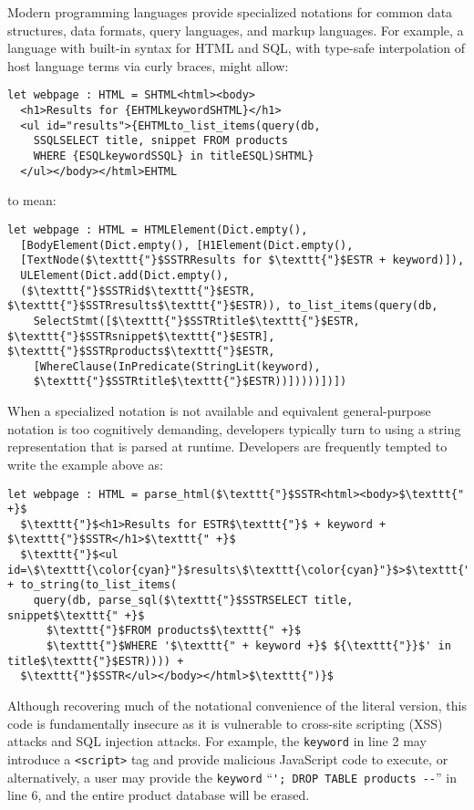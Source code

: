 \documentclass{sig-alternate}
\let\li\lstinline
\begin{document}
Modern programming languages  provide specialized notations for common data structures, data formats, query languages, and markup languages. For example, a language with built-in syntax for HTML and SQL, with type-safe interpolation of host language terms via curly braces, might allow:

\begin{lstlisting}
let webpage : HTML = SHTML<html><body>
  <h1>Results for {EHTMLkeywordSHTML}</h1>
  <ul id="results">{EHTMLto_list_items(query(db, 
    SSQLSELECT title, snippet FROM products
    WHERE {ESQLkeywordSSQL} in titleESQL)SHTML}
  </ul></body></html>EHTML
\end{lstlisting}

to mean:

\begin{lstlisting}
let webpage : HTML = HTMLElement(Dict.empty(),
  [BodyElement(Dict.empty(), [H1Element(Dict.empty(),
  [TextNode($\texttt{"}$SSTRResults for $\texttt{"}$ESTR + keyword)]), 
  ULElement(Dict.add(Dict.empty(),
  ($\texttt{"}$SSTRid$\texttt{"}$ESTR, $\texttt{"}$SSTRresults$\texttt{"}$ESTR)), to_list_items(query(db, 
    SelectStmt([$\texttt{"}$SSTRtitle$\texttt{"}$ESTR, $\texttt{"}$SSTRsnippet$\texttt{"}$ESTR], $\texttt{"}$SSTRproducts$\texttt{"}$ESTR, 
    [WhereClause(InPredicate(StringLit(keyword),
    $\texttt{"}$SSTRtitle$\texttt{"}$ESTR))]))))])])
\end{lstlisting}

When a specialized notation is not available and equivalent general-purpose notation is too cognitively demanding, developers typically turn to using a string representation that is parsed at runtime. Developers are frequently  tempted to write the example above as:

\begin{lstlisting}
let webpage : HTML = parse_html($\texttt{"}$SSTR<html><body>$\texttt{" +}$
  $\texttt{"}$<h1>Results for ESTR$\texttt{"}$ + keyword + $\texttt{"}$SSTR</h1>$\texttt{" +}$
  $\texttt{"}$<ul id=\$\texttt{\color{cyan}"}$results\$\texttt{\color{cyan}"}$>$\texttt{"}$ESTR + to_string(to_list_items(
    query(db, parse_sql($\texttt{"}$SSTRSELECT title, snippet$\texttt{" +}$
      $\texttt{"}$FROM products$\texttt{" +}$
      $\texttt{"}$WHERE '$\texttt{" + keyword +}$ ${\texttt{"}}$' in title$\texttt{"}$ESTR)))) + 
  $\texttt{"}$SSTR</ul></body></html>$\texttt{")}$
\end{lstlisting}

Although recovering much of the notational convenience of the literal version, this code is fundamentally insecure as it is vulnerable to cross-site scripting (XSS) attacks and SQL injection attacks. For example, the \li{keyword} in line 2 may introduce a \li{<script>} tag and provide malicious JavaScript code to execute, or alternatively, a user may provide the \li{keyword} ``\li{'; DROP TABLE products --}'' in line 6, and the entire product database will be erased.
\end{document}
